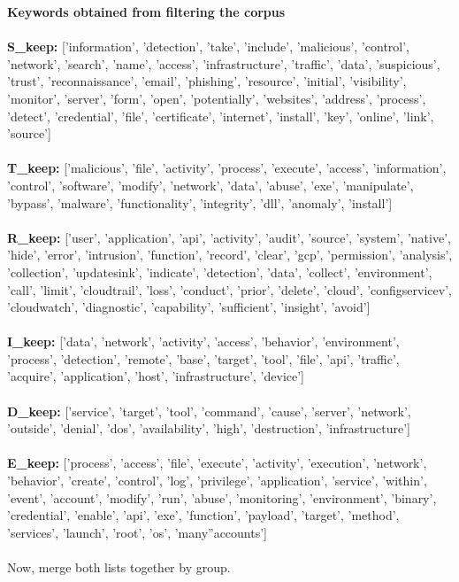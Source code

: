 \textbf{Keywords obtained from filtering the corpus}\\\\
\textbf{S\_keep:} ['information', 'detection', 'take',  'include', 'malicious', 'control', 'network', 'search', 'name', 'access', 'infrastructure', 'traffic', 'data', 'suspicious', 'trust', 'reconnaissance', 'email', 'phishing', 'resource', 'initial', 'visibility', 'monitor', 'server', 'form', 'open', 'potentially', 'websites', 'address', 'process', 'detect', 'credential', 'file', 'certificate', 'internet', 'install', 'key', 'online', 'link', 'source'] \\\\
\textbf{T\_keep:} ['malicious', 'file', 'activity', 'process', 'execute', 'access', 'information', 'control', 'software', 'modify', 'network', 'data', 'abuse', 'exe', 'manipulate', 'bypass', 'malware', 'functionality', 'integrity', 'dll', 'anomaly', 'install'] \\\\
\textbf{R\_keep:} ['user', 'application', 'api', 'activity', 'audit', 'source', 'system', 'native', 'hide', 'error', 'intrusion', 'function', 'record', 'clear', 'gcp', 'permission', 'analysis', 'collection', 'updatesink', 'indicate', 'detection', 'data', 'collect', 'environment', 'call', 'limit', 'cloudtrail', 'loss', 'conduct', 'prior', 'delete', 'cloud', 'configservicev', 'cloudwatch', 'diagnostic', 'capability', 'sufficient', 'insight', 'avoid'] \\\\
\textbf{I\_keep:} ['data', 'network', 'activity', 'access', 'behavior', 'environment', 'process', 'detection', 'remote', 'base', 'target', 'tool', 'file', 'api', 'traffic', 'acquire', 'application', 'host', 'infrastructure', 'device'] \\\\
\textbf{D\_keep:} ['service', 'target', 'tool', 'command', 'cause', 'server', 'network', 'outside', 'denial', 'dos', 'availability', 'high', 'destruction', 'infrastructure'] \\\\
\textbf{E\_keep:} ['process', 'access', 'file', 'execute', 'activity', 'execution', 'network', 'behavior', 'create', 'control', 'log', 'privilege', 'application', 'service', 'within', 'event', 'account', 'modify', 'run', 'abuse', 'monitoring', 'environment', 'binary', 'credential', 'enable', 'api', 'exe', 'function', 'payload', 'target', 'method', 'services', 'launch', 'root', 'os', 'many''accounts'] \\\\

Now, merge both lists together by group. \\